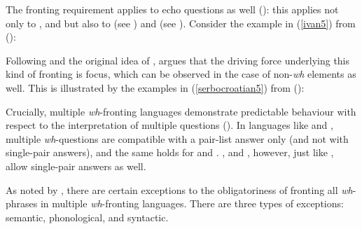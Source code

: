 \ea \label{scfronting}
\z
\z

The fronting requirement applies to echo questions as well (\citealt[356]{boskovic2012}): this applies not only to ,  and  but also to  (see \citealt{wachowicz1974}) and  (see \citealt{ekiss1987}). Consider the example in (\ref{ivan5}) from  (\citealt[356, ex. 16a]{boskovic2012}):

\z

Following \citet{stjepanovic1999diss} and the original idea of \citet{horvath1986}, \citet[356--357]{boskovic2012} argues that the driving force underlying this kind of fronting is focus, which can be observed in the case of non-\textit{wh} elements as well. This is illustrated by the examples in (\ref{serbocroatian5}) from  (\citealt[357, ex. 17]{boskovic2012}):

\ea \label{serbocroatian5}
\z
\z

Crucially, multiple \textit{wh}-fronting languages demonstrate predictable behaviour with respect to the interpretation of multiple questions (\citealt[357--359]{boskovic2012}). In languages like  and , multiple \textit{wh}-questions are compatible with a pair-list answer only (and not with single-pair answers), and the same holds for  and . ,  and , however, just like , allow single-pair answers as well.

As noted by \citet[359--379]{boskovic2012}, there are certain exceptions to the obligatoriness of fronting all \textit{wh}-phrases in multiple \textit{wh}-fronting languages. There are three types of exceptions: semantic, phonological, and syntactic.

